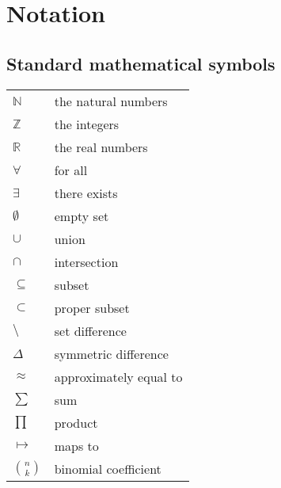 \chapter*{Notation}\label{chap:notation}

\section*{Standard mathematical symbols}
\begin{tabular}{ll}
$\mathbb{N}$			& the natural numbers \\
$\mathbb{Z}$			& the integers \\
$\mathbb{R}$			& the real numbers \\
$\forall$				& for all \\
$\exists$				& there exists \\
$\emptyset$				& empty set \\
$\cup$					& union \\
$\cap$					& intersection \\
$\subseteq$				& subset\\
$\subset$				& proper subset \\
$\setminus$				& set difference \\
$\Delta$				& symmetric difference \\
$\approx$				& approximately equal to \\
$\sum$					& sum \\
$\prod$					& product \\
$\mapsto$				& maps to \\
$\binom{n}{k}$			& binomial coefficient 
\end{tabular}

